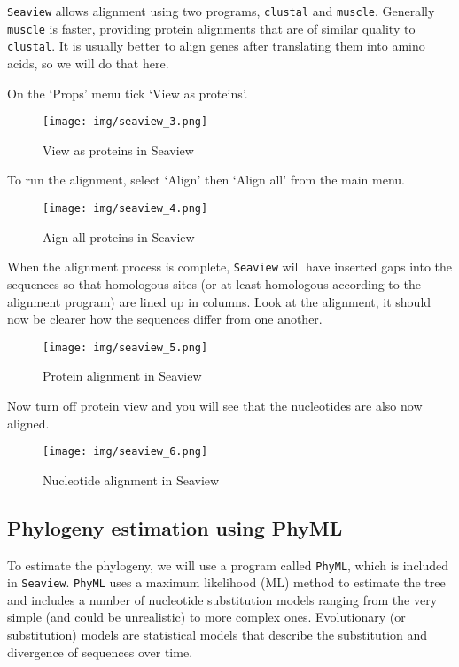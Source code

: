 \documentclass[11pt]{article}
\begin{document}
\texttt{Seaview} allows alignment using two programs, \texttt{clustal}
and \texttt{muscle}. Generally \texttt{muscle} is faster, providing
protein alignments that are of similar quality to \texttt{clustal}. It
is usually better to align genes after translating them into amino
acids, so we will do that here.

    On the `Props' menu tick `View as proteins'.

    \begin{figure}
\centering
\texttt{[image: img/seaview\_3.png]}
\caption{View as proteins in Seaview}
\end{figure}

    To run the alignment, select `Align' then `Align all' from the main
menu.

    \begin{figure}
\centering
\texttt{[image: img/seaview\_4.png]}
\caption{Aign all proteins in Seaview}
\end{figure}

    When the alignment process is complete, \texttt{Seaview} will have
inserted gaps into the sequences so that homologous sites (or at least
homologous according to the alignment program) are lined up in columns.
Look at the alignment, it should now be clearer how the sequences differ
from one another.

    \begin{figure}
\centering
\texttt{[image: img/seaview\_5.png]}
\caption{Protein alignment in Seaview}
\end{figure}

    Now turn off protein view and you will see that the nucleotides are also
now aligned.

    \begin{figure}
\centering
\texttt{[image: img/seaview\_6.png]}
\caption{Nucleotide alignment in Seaview}
\end{figure}

    \hypertarget{phylogeny-estimation-using-phyml}{%
\subsection{Phylogeny estimation using
PhyML}\label{phylogeny-estimation-using-phyml}}

To estimate the phylogeny, we will use a program called \texttt{PhyML},
which is included in \texttt{Seaview}. \texttt{PhyML} uses a maximum
likelihood (ML) method to estimate the tree and includes a number of
nucleotide substitution models ranging from the very simple (and could
be unrealistic) to more complex ones. Evolutionary (or substitution)
models are statistical models that describe the substitution and
divergence of sequences over time.
\end{document}
